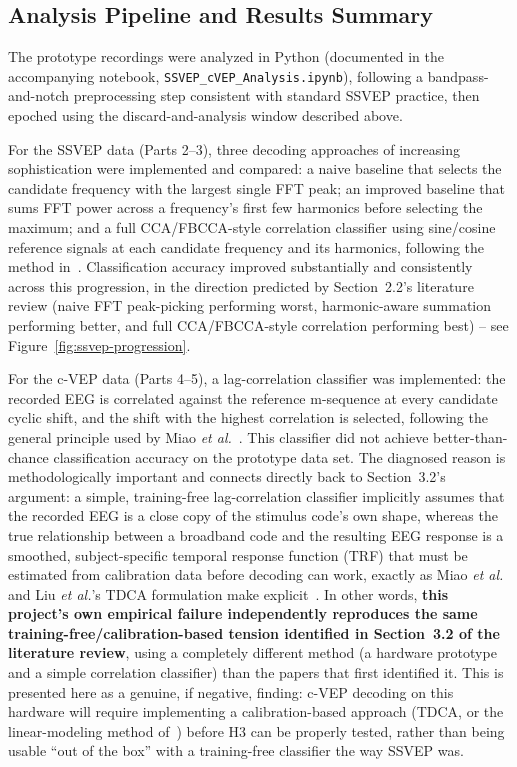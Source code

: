 \documentclass[11pt]{article}
\begin{document}
\subsection{Analysis Pipeline and Results Summary}

The prototype recordings were analyzed in Python (documented in the accompanying notebook, \texttt{SSVEP\_cVEP\_Analysis.ipynb}), following a bandpass-and-notch preprocessing step consistent with standard SSVEP practice, then epoched using the discard-and-analysis window described above.

For the SSVEP data (Parts 2--3), three decoding approaches of increasing sophistication were implemented and compared: a naive baseline that selects the candidate frequency with the largest single FFT peak; an improved baseline that sums FFT power across a frequency's first few harmonics before selecting the maximum; and a full CCA/FBCCA-style correlation classifier using sine/cosine reference signals at each candidate frequency and its harmonics, following the method in~\cite{lin2007cca,chen2015fbcca}. Classification accuracy improved substantially and consistently across this progression, in the direction predicted by Section~2.2's literature review (naive FFT peak-picking performing worst, harmonic-aware summation performing better, and full CCA/FBCCA-style correlation performing best) -- see Figure~\ref{fig:ssvep-progression}.

For the c-VEP data (Parts 4--5), a lag-correlation classifier was implemented: the recorded EEG is correlated against the reference m-sequence at every candidate cyclic shift, and the shift with the highest correlation is selected, following the general principle used by Miao \textit{et al.}~\cite{miao2024cvepminimal}. This classifier did not achieve better-than-chance classification accuracy on the prototype data set. The diagnosed reason is methodologically important and connects directly back to Section~3.2's argument: a simple, training-free lag-correlation classifier implicitly assumes that the recorded EEG is a close copy of the stimulus code's own shape, whereas the true relationship between a broadband code and the resulting EEG response is a smoothed, subject-specific temporal response function (TRF) that must be estimated from calibration data before decoding can work, exactly as Miao \textit{et al.} and Liu \textit{et al.}'s TDCA formulation make explicit~\cite{miao2024cvepminimal,liu2021tdca}. In other words, \textbf{this project's own empirical failure independently reproduces the same training-free/calibration-based tension identified in Section~3.2 of the literature review}, using a completely different method (a hardware prototype and a simple correlation classifier) than the papers that first identified it. This is presented here as a genuine, if negative, finding: c-VEP decoding on this hardware will require implementing a calibration-based approach (TDCA, or the linear-modeling method of~\cite{miao2024cvepminimal}) before H3 can be properly tested, rather than being usable ``out of the box'' with a training-free classifier the way SSVEP was.
\end{document}
